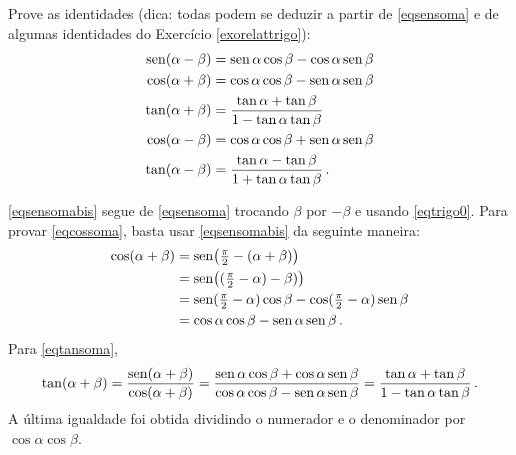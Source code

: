 \begin{exo} Prove as identidades (dica: todas podem se deduzir a partir de
\eqref{eqsensoma} e de algumas identidades do Exercício \ref{exorelattrigo}):
\begin{align}
\operatorname{sen}(\alpha-\beta)&=\operatorname{sen}\alpha\cos\beta-\cos \alpha\operatorname{sen}\beta\label{eqsensomabis}\\
\cos(\alpha+\beta)&=\cos\alpha\cos\beta-\operatorname{sen} \alpha\operatorname{sen}\beta\label{eqcossoma}\\
 \tan(\alpha+\beta)&=\frac{\tan \alpha+\tan \beta}{1-\tan\alpha \tan
\beta}\label{eqtansoma}\\
\cos(\alpha-\beta)&=\cos\alpha\cos\beta+\operatorname{sen} \alpha\operatorname{sen}\beta\label{eqcossomabis}\\
 \tan(\alpha-\beta)&=\frac{\tan \alpha-\tan \beta}{1+\tan\alpha \tan
\beta}\label{eqtansomabis}\,.
\end{align}
\begin{sol}
 \eqref{eqsensomabis} segue de \eqref{eqsensoma} trocando $\beta$ por $-\beta$ e usando
\eqref{eqtrigo0}. Para provar 
\eqref{eqcossoma}, basta usar  \eqref{eqsensomabis} da seguinte maneira:
\begin{align*}
 \cos(\alpha+\beta)&=\operatorname{sen}\bigl(\tfrac{\pi}{2}-(\alpha+\beta)\bigr)\\
&=\operatorname{sen}\bigl((\tfrac{\pi}{2}-\alpha)-\beta)\bigr)\\
&=\operatorname{sen}(\tfrac{\pi}{2}-\alpha)\cos\beta-\cos (\tfrac{\pi}{2}-\alpha)\operatorname{sen} \beta\\
&=\cos \alpha\cos\beta-\operatorname{sen}\alpha\operatorname{sen}\beta\,.
\end{align*}
Para \eqref{eqtansoma},
\begin{align*}
 \tan(\alpha+\beta)=\frac{\operatorname{sen}(\alpha+\beta)}{\cos(\alpha+\beta)}=
\frac{\operatorname{sen}\alpha\cos\beta+\cos \alpha\operatorname{sen}\beta}{
\cos\alpha\cos\beta-\operatorname{sen} \alpha\operatorname{sen}\beta}
=\frac{\tan \alpha+\tan\beta}{1-\tan\alpha\tan\beta}\,.
\end{align*}
 A última igualdade foi obtida dividindo o numerador e o denominador por
$\cos\alpha\cos\beta$.
\end{sol}
\end{exo}

